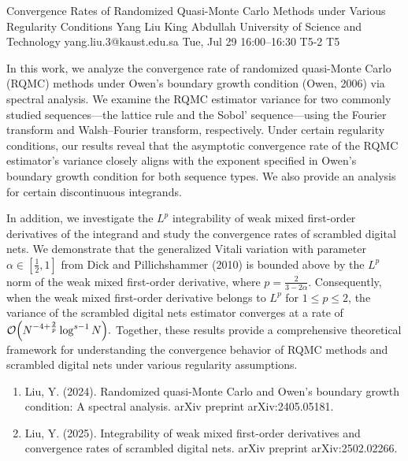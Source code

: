 \begin{talk}
  {Convergence Rates of Randomized Quasi-Monte Carlo Methods under Various Regularity Conditions}%
  {Yang Liu}%
  {King Abdullah University of Science and Technology}%
  {yang.liu.3@kaust.edu.sa}%
  {}%
  {}%
  {Tue, Jul 29 16:00--16:30}%
  {T5-2}%
  {T5}%
  
    
        
        In this work, we analyze the convergence rate of randomized quasi-Monte Carlo (RQMC) methods under Owen's boundary growth condition (Owen, 2006) via spectral analysis. We examine the RQMC estimator variance for two commonly studied sequences—the lattice rule and the Sobol' sequence—using the Fourier transform and Walsh--Fourier transform, respectively. Under certain regularity conditions, our results reveal that the asymptotic convergence rate of the RQMC estimator's variance closely aligns with the exponent specified in Owen's boundary growth condition for both sequence types. We also provide an analysis for certain discontinuous integrands.

        In addition, we investigate the \(L^p\) integrability of weak mixed first-order derivatives of the integrand and study the convergence rates of scrambled digital nets. We demonstrate that the generalized Vitali variation with parameter \(\alpha \in \left[\frac{1}{2}, 1\right]\) from Dick and Pillichshammer (2010) is bounded above by the \(L^p\) norm of the weak mixed first-order derivative, where \(p = \frac{2}{3-2\alpha}\). Consequently, when the weak mixed first-order derivative belongs to \(L^p\) for \(1 \leq p \leq 2\), the variance of the scrambled digital nets estimator converges at a rate of
        \(
        \mathcal{O}\Bigl(N^{-4+\frac{2}{p}} \log^{s-1} N\Bigr).
        \)
        Together, these results provide a comprehensive theoretical framework for understanding the convergence behavior of RQMC methods and scrambled digital nets under various regularity assumptions.
        

\medskip

\begin{enumerate}
 \item[{[1]}] Liu, Y. (2024). Randomized quasi-Monte Carlo and Owen's boundary growth condition: A spectral analysis. arXiv preprint arXiv:2405.05181.
 \item[{[2]}] Liu, Y. (2025). Integrability of weak mixed first-order derivatives and convergence rates of scrambled digital nets. arXiv preprint arXiv:2502.02266.
\end{enumerate}


\end{talk}
